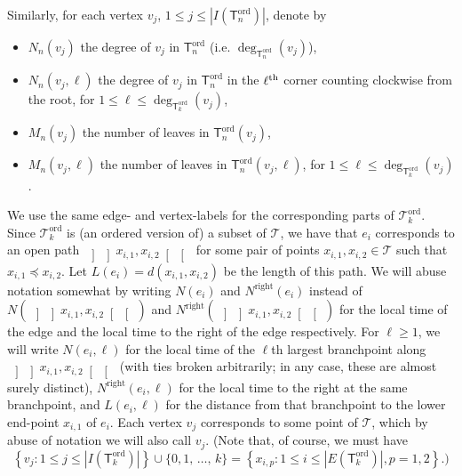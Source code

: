 \documentclass[AHL,Unicode,longabstracts,published]{cedram}
\newcommand{\abs}[1]{\left\lvert#1\right\rvert}
\newcommand{\oseg}[2]{\, \left] \! \left] #1, #2 \right[\! \right[\,}
\newcommand{\ord}{\mathrm{ord}}
\newcommand{\Rightll}{\mathrm{right}}
\newcommand{\cT}{\mathcal{T}}
\newcommand{\sT}{\mathsf{T}}
\begin{document}
Similarly, for each vertex $v_j$, $1 \leq j \leq \abs{I(\sT^{\ord}_n)}$, denote by
\begin{itemize}
\item $N_{n}(v_j)$ the degree of $v_j$ in $\sT^{\ord}_n$ (i.e. $\deg_{\sT_n^{\ord}}(v_j)$),
\item $N_{n}(v_j,\ell)$ the degree of $v_j$ in $\sT_n^{\ord}$ in the $\ell^{\rm th}$ corner counting clockwise from the root, for $1 \leq \ell \leq \deg_{\sT_k^{\ord}}(v_j)$,
\item $M_{n}(v_j)$ the number of leaves in $\sT_n^{\ord}(v_j)$,
\item $M_{n}(v_j,\ell)$ the number of leaves in $\sT_n^{\ord}(v_j, \ell)$, for $1 \leq \ell \leq \deg_{\sT_k^{\ord}}(v_j)$.
\end{itemize}
We use the same edge- and vertex-labels for the corresponding parts of $\cT^{\ord}_k$. Since $\cT^{\ord}_k$ is (an ordered version of) a subset of $\cT$, we have that $e_i$ corresponds to an open path $\oseg{x_{i,1}}{x_{i,2}}$ for some pair of points $x_{i,1}, x_{i,2} \in \cT$ such that $x_{i,1} \preceq x_{i,2}$. Let $L(e_i)=d(x_{i,1}, x_{i,2})$ be the length of this path. We will abuse notation somewhat by writing $N(e_i)$ and $N^{\Rightll}(e_i)$ instead of $N(\oseg{x_{i,1}}{x_{i,2}})$ and $N^{\Rightll}(\oseg{x_{i,1}}{x_{i,2}})$ for the local time of the edge and the local time to the right of the edge respectively. For $\ell \ge 1$, we will write $N(e_i, \ell)$ for the local time of the $\ell$th largest branchpoint along $\oseg{x_{i,1}}{x_{i,2}}$ (with ties broken arbitrarily; in any case, these are almost surely distinct), $N^{\Rightll}(e_i, \ell)$ for the local time to the right at the same branchpoint, and $L(e_i,\ell)$ for the distance from that branchpoint to the lower end-point $x_{i,1}$ of $e_i$. Each vertex $v_j$ corresponds to some point of $\cT$, which by abuse of notation we will also call $v_j$. (Note that, of course, we must have 
\[
\left\{v_j: 1 \le j \le \abs{I\left(\sT_k^{\ord}\right)}\right\} \cup \{0,1,\,\ldots,\,k\}= 
\left\{x_{i,p}: 1 \le i \le \abs{E\left(\sT_k^{\ord}\right)}, p=1,2\right\}.)
\]
\end{document}
